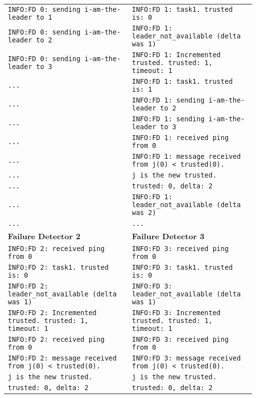 \documentclass[a4paper]{article}
\begin{document}
\begin{compactitem}
\begin{table}[H]
\begin{tabular}{ll}
		\verb|INFO:FD 0: sending i-am-the-leader to 1| & \verb|INFO:FD 1: task1. trusted is: 0| \\
		\verb|INFO:FD 0: sending i-am-the-leader to 2| & \verb|INFO:FD 1: leader_not_available (delta was 1)| \\
		\verb|INFO:FD 0: sending i-am-the-leader to 3| & \verb|INFO:FD 1: Incremented trusted. trusted: 1, timeout: 1| \\
		\verb|...| & \verb|INFO:FD 1: task1. trusted is: 1| \\
		\verb|...| & \verb|INFO:FD 1: sending i-am-the-leader to 2| \\
		\verb|...| & \verb|INFO:FD 1: sending i-am-the-leader to 3| \\
		\verb|...| & \verb|INFO:FD 1: received ping from 0| \\
		\verb|...| & \verb|INFO:FD 1: message received from j(0) < trusted(0). | \\
		\verb|...| & \hspace{16pt}\verb|j is the new trusted.| \\
		\verb|...| & \verb|trusted: 0, delta: 2| \\
		\verb|...| & \verb|INFO:FD 1: leader_not_available (delta was 2)| \\
		\verb|...| & \verb|...| \\
        \midrule
		\textbf{Failure Detector 2} & \textbf{Failure Detector 3} \\
		\midrule
        \verb|INFO:FD 2: received ping from 0| & \verb|INFO:FD 3: received ping from 0| \\
		\verb|INFO:FD 2: task1. trusted is: 0| & \verb|INFO:FD 3: task1. trusted is: 0| \\
		\verb|INFO:FD 2: leader_not_available (delta was 1)| & \verb|INFO:FD 3: leader_not_available (delta was 1)| \\
		\verb|INFO:FD 2: Incremented trusted. trusted: 1, timeout: 1| & \verb|INFO:FD 3: Incremented trusted. trusted: 1, timeout: 1| \\
		\verb|INFO:FD 2: received ping from 0| & \verb|INFO:FD 3: received ping from 0| \\
		\verb|INFO:FD 2: message received from j(0) < trusted(0). | & \verb|INFO:FD 3: message received from j(0) < trusted(0). | \\
		\hspace{16pt}\verb|j is the new trusted.| & \hspace{16pt}\verb|j is the new trusted.| \\
		\verb|trusted: 0, delta: 2| & \verb|trusted: 0, delta: 2| \\

\end{tabular}
\end{table}
\end{compactitem}
\end{document}
